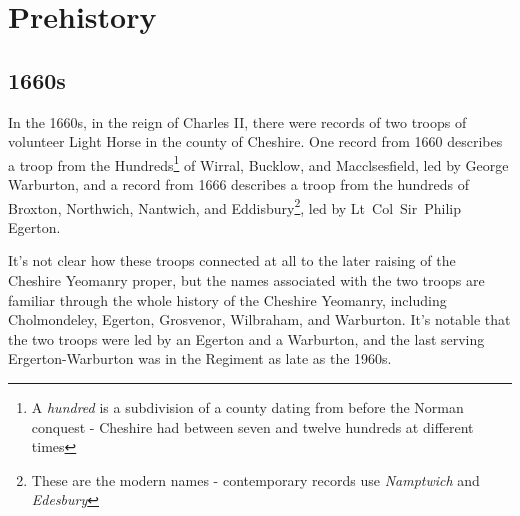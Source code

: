 \chapter{Prehistory}

\begin{multicols}{2}
\small

\section*{1660s}

In the 1660s, in the reign of Charles II, there were records of two troops of volunteer Light Horse in the county of Cheshire. One record from 1660 describes a troop from the Hundreds\footnote{A \emph{hundred} is a subdivision of a county dating from before the Norman conquest - Cheshire had between seven and twelve hundreds at different times} of Wirral, Bucklow, and Macclsesfield, led by George Warburton, and a record from 1666 describes a troop from the hundreds of Broxton, Northwich, Nantwich, and Eddisbury\footnote{These are the modern names - contemporary records use \textit{Namptwich} and \textit{Edesbury}}, led by Lt~Col~Sir~Philip Egerton.

It's not clear how these troops connected at all to the later raising of the Cheshire Yeomanry proper, but the names associated with the two troops are familiar through the whole history of the Cheshire Yeomanry, including Cholmondeley, Egerton, Grosvenor, Wilbraham, and Warburton. It's notable that the two troops were led by an Egerton and a Warburton, and the last serving Ergerton-Warburton was in the Regiment as late as the 1960s.

\end{multicols}
